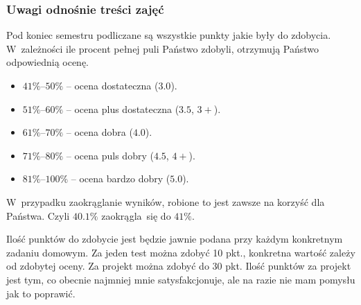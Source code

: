 \documentclass[10pt,t]{beamer}
\begin{document}
\begin{frame}
  \frametitle{Uwagi odnośnie treści zajęć}


  Pod koniec semestru podliczane są wszystkie punkty jakie były do
  zdobycia. W~zależności ile procent pełnej puli Państwo zdobyli, otrzymują
  Państwo odpowiednią ocenę.

  \begin{itemize}

  \item $41\%\text{--}50\%$ -- ocena dostateczna ($3.0$).

  \item $51\%\text{--}60\%$ -- ocena plus dostateczna ($3.5$, $3+$).

  \item $61\%\text{--}70\%$ -- ocena dobra ($4.0$).

  \item $71\%\text{--}80\%$ -- ocena puls dobry ($4.5$, $4+$).

  \item $81\%\text{--}100\%$ -- ocena bardzo dobry ($5.0$).

  \end{itemize}

  W~przypadku zaokrąglanie wyników, robione to jest zawsze na korzyść dla
  Państwa. Czyli $40.1\%$ zaokrągla~się do $41\%$.

  Ilość punktów do zdobycie jest będzie jawnie podana przy każdym
  konkretnym zadaniu domowym. Za jeden test można zdobyć 10 pkt., konkretna
  wartość zależy od zdobytej oceny. Za projekt można zdobyć do 30 pkt.
  Ilość punktów za projekt jest tym, co obecnie najmniej mnie
  satysfakcjonuje, ale na razie nie mam pomysłu jak to poprawić.

\end{frame}
\end{document}
